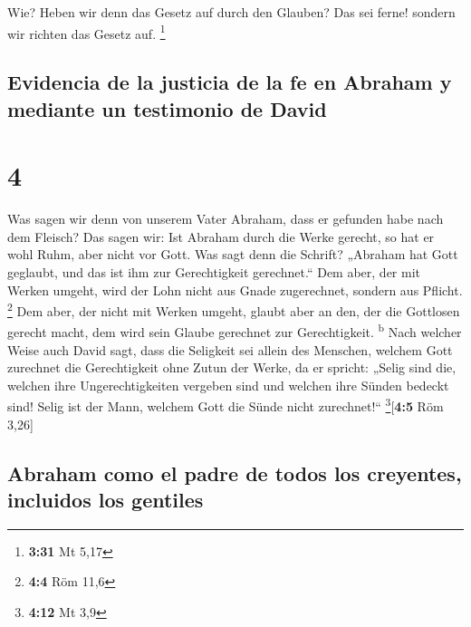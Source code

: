  Wie? Heben wir denn das Gesetz auf durch den Glauben?
Das sei ferne! sondern wir richten das Gesetz auf. \footnote{\textbf{3:31}
  Mt 5,17}

\hypertarget{evidencia-de-la-justicia-de-la-fe-en-abraham-y-mediante-un-testimonio-de-david}{%
\subsection{Evidencia de la justicia de la fe en Abraham y mediante un
testimonio de
David}\label{evidencia-de-la-justicia-de-la-fe-en-abraham-y-mediante-un-testimonio-de-david}}

\hypertarget{section-3}{%
\section{4}\label{section-3}}

 Was sagen wir denn von unserem Vater Abraham, dass er
gefunden habe nach dem Fleisch?  Das sagen wir: Ist
Abraham durch die Werke gerecht, so hat er wohl Ruhm, aber nicht vor
Gott.  Was sagt denn die Schrift? „Abraham hat Gott
geglaubt, und das ist ihm zur Gerechtigkeit gerechnet.`` 
Dem aber, der mit Werken umgeht, wird der Lohn nicht aus Gnade
zugerechnet, sondern aus Pflicht. \footnote{\textbf{4:4} Röm 11,6}
 Dem aber, der nicht mit Werken umgeht, glaubt aber an
den, der die Gottlosen gerecht macht, dem wird sein Glaube gerechnet zur
Gerechtigkeit. \textsuperscript{b}  Nach welcher Weise
auch David sagt, dass die Seligkeit sei allein des Menschen, welchem
Gott zurechnet die Gerechtigkeit ohne Zutun der Werke, da er spricht:
 „Selig sind die, welchen ihre Ungerechtigkeiten vergeben
sind und welchen ihre Sünden bedeckt sind!  Selig ist der
Mann, welchem Gott die Sünde nicht zurechnet!{}``
\footnote{\textbf{4:12} Mt 3,9}{[}\textbf{4:5} Röm 3,26{]}

\hypertarget{abraham-como-el-padre-de-todos-los-creyentes-incluidos-los-gentiles}{%
\subsection{Abraham como el padre de todos los creyentes, incluidos los
gentiles}\label{abraham-como-el-padre-de-todos-los-creyentes-incluidos-los-gentiles}}

